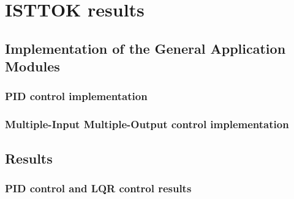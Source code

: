 \chapter{ISTTOK  results }

\section{Implementation of the General Application Modules }
\subsection{PID control implementation}
\subsection{Multiple-Input Multiple-Output control implementation}

\section{Results}
\subsection{PID control and LQR control results}


